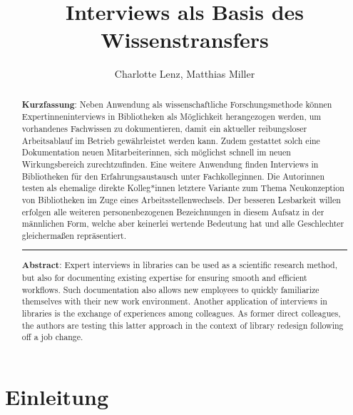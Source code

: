 \documentclass[a4paper,
fontsize=11pt,
oneside,
numbers=noperiodatend,
parskip=half-,
bibliography=totoc,
final
]{scrartcl}
\title{\LARGE{Interviews als Basis des Wissenstransfers }}%
\author{Charlotte Lenz, Matthias Miller} %
\date{}
\begin{document}
\maketitle
\thispagestyle{fancyplain} 

\begin{abstract}
\noindent
\textbf{Kurzfassung}: Neben Anwendung als wissenschaftliche
Forschungsmethode können Expert\*inneninterviews in Bibliotheken als
Möglichkeit herangezogen werden, um vorhandenes Fachwissen zu
dokumentieren, damit ein aktueller reibungsloser Arbeitsablauf im
Betrieb gewährleistet werden kann. Zudem gestattet solch eine
Dokumentation neuen Mitarbeiter\*innen, sich möglichst schnell im neuen
Wirkungsbereich zurechtzufinden. Eine weitere Anwendung finden
Interviews in Bibliotheken für den Erfahrungsaustausch unter
Fachkolleg\*innen. Die Autor\*innen testen als ehemalige direkte
Kolleg*innen letztere Variante zum Thema Neukonzeption von Bibliotheken
im Zuge eines Arbeitsstellenwechsels. Der besseren Lesbarkeit willen
erfolgen alle weiteren personenbezogenen Bezeichnungen in diesem Aufsatz
in der männlichen Form, welche aber keinerlei wertende Bedeutung hat und
alle Geschlechter gleichermaßen repräsentiert.

\begin{center}\rule{0.5\linewidth}{0.5pt}\end{center}

\noindent\textbf{Abstract}: Expert interviews in libraries can be used as a
scientific research method, but also for documenting existing expertise
for ensuring smooth and efficient workflows. Such documentation also
allows new employees to quickly familiarize themselves with their new
work environment. Another application of interviews in libraries is the
exchange of experiences among colleagues. As former direct colleagues,
the authors are testing this latter approach in the context of library
redesign following off a job change.
\end{abstract}

\section{Einleitung}\label{einleitung}
\end{document}
